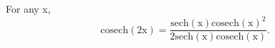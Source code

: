 For any x, 
\[ \mathrm{cosech(2x)}
 = \frac{\mathrm{sech(x)cosech(x)}^2 }
{ 2 \mathrm{sech(x)cosech(x)} } . \] 